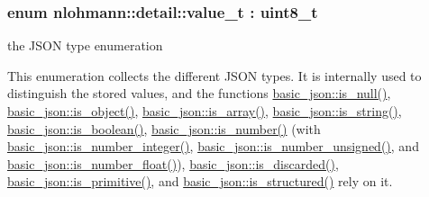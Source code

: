 \subsubsection[{\texorpdfstring{value\+\_\+t}{value_t}}]{\setlength{\rightskip}{0pt plus 5cm}enum {\bf nlohmann\+::detail\+::value\+\_\+t} \+: uint8\+\_\+t\hspace{0.3cm}{\ttfamily [strong]}}\hypertarget{namespacenlohmann_1_1detail_a90aa5ef615aa8305e9ea20d8a947980f}{}\label{namespacenlohmann_1_1detail_a90aa5ef615aa8305e9ea20d8a947980f}


the J\+S\+ON type enumeration 

This enumeration collects the different J\+S\+ON types. It is internally used to distinguish the stored values, and the functions \hyperlink{classnlohmann_1_1basic__json_a8faa039ca82427ed29c486ffd00600c3}{basic\+\_\+json\+::is\+\_\+null()}, \hyperlink{classnlohmann_1_1basic__json_af8f511af124e82e4579f444b4175787c}{basic\+\_\+json\+::is\+\_\+object()}, \hyperlink{classnlohmann_1_1basic__json_aef9ce5dd2381caee1f8ddcdb5bdd9c65}{basic\+\_\+json\+::is\+\_\+array()}, \hyperlink{classnlohmann_1_1basic__json_a69b596a4a6683b362095c9a139637396}{basic\+\_\+json\+::is\+\_\+string()}, \hyperlink{classnlohmann_1_1basic__json_a943e8cb182d0f2365c76d64b42eaa6fd}{basic\+\_\+json\+::is\+\_\+boolean()}, \hyperlink{classnlohmann_1_1basic__json_a2b9852390abb4b1ef5fac6984e2fc0f3}{basic\+\_\+json\+::is\+\_\+number()} (with \hyperlink{classnlohmann_1_1basic__json_abac8af76067f1e8fdca9052882c74428}{basic\+\_\+json\+::is\+\_\+number\+\_\+integer()}, \hyperlink{classnlohmann_1_1basic__json_abc7378cba0613a78b9aad1c8e7044bb0}{basic\+\_\+json\+::is\+\_\+number\+\_\+unsigned()}, and \hyperlink{classnlohmann_1_1basic__json_a33b4bf898b857c962e798fc7f6e86e70}{basic\+\_\+json\+::is\+\_\+number\+\_\+float()}), \hyperlink{classnlohmann_1_1basic__json_aabe623bc8304c2ba92d96d91f390fab4}{basic\+\_\+json\+::is\+\_\+discarded()}, \hyperlink{classnlohmann_1_1basic__json_a6362b88718eb5c6d4fed6a61eed44b95}{basic\+\_\+json\+::is\+\_\+primitive()}, and \hyperlink{classnlohmann_1_1basic__json_a9f68a0af820c3ced7f9d17851ce4c22d}{basic\+\_\+json\+::is\+\_\+structured()} rely on it.

